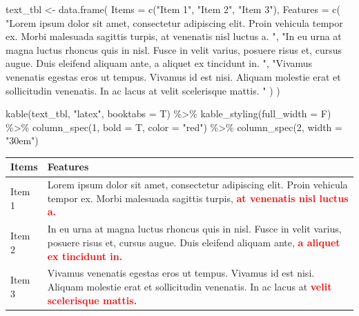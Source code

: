 \documentclass[12pt,a4paper,oneside,]{book}
\newenvironment{Shaded}{\begin{snugshade}}{\end{snugshade}}
\newcommand{\AttributeTok}[1]{\textcolor[rgb]{0.77,0.63,0.00}{#1}}
\newcommand{\DecValTok}[1]{\textcolor[rgb]{0.00,0.00,0.81}{#1}}
\newcommand{\FunctionTok}[1]{\textcolor[rgb]{0.00,0.00,0.00}{#1}}
\newcommand{\NormalTok}[1]{#1}
\newcommand{\OtherTok}[1]{\textcolor[rgb]{0.56,0.35,0.01}{#1}}
\newcommand{\SpecialCharTok}[1]{\textcolor[rgb]{0.00,0.00,0.00}{#1}}
\newcommand{\StringTok}[1]{\textcolor[rgb]{0.31,0.60,0.02}{#1}}
\numberwithin{dummy}{section}
\theoremstyle{ocrenumbox}
\theoremstyle{blacknumex}
\theoremstyle{blacknumbox}
\theoremstyle{ocrenum}
\theoremstyle{ocrenum}
\begin{document}
\begin{Shaded}
\begin{Highlighting}[]
\NormalTok{text\_tbl }\OtherTok{\textless{}{-}} \FunctionTok{data.frame}\NormalTok{(}
  \AttributeTok{Items =} \FunctionTok{c}\NormalTok{(}\StringTok{"Item 1"}\NormalTok{, }\StringTok{"Item 2"}\NormalTok{, }\StringTok{"Item 3"}\NormalTok{), }
  \AttributeTok{Features =} \FunctionTok{c}\NormalTok{(}
    \StringTok{"Lorem ipsum dolor sit amet, consectetur adipiscing elit.}
\StringTok{    Proin vehicula tempor ex. Morbi malesuada sagittis turpis,}
\StringTok{    at venenatis nisl luctus a. "}\NormalTok{,}
    \StringTok{"In eu urna at magna luctus rhoncus quis in nisl. Fusce in velit}
\StringTok{    varius, posuere risus et, cursus augue. Duis eleifend aliquam ante,}
\StringTok{    a aliquet ex tincidunt in. "}\NormalTok{,}
    \StringTok{"Vivamus venenatis egestas eros ut tempus. Vivamus id est nisi.}
\StringTok{    Aliquam molestie erat et sollicitudin venenatis. In ac lacus at}
\StringTok{    velit scelerisque mattis. "}
\NormalTok{    ) }
\NormalTok{  )}

\FunctionTok{kable}\NormalTok{(text\_tbl, }\StringTok{"latex"}\NormalTok{, }\AttributeTok{booktabs =}\NormalTok{ T) }\SpecialCharTok{\%\textgreater{}\%} 
  \FunctionTok{kable\_styling}\NormalTok{(}\AttributeTok{full\_width =}\NormalTok{ F) }\SpecialCharTok{\%\textgreater{}\%} 
  \FunctionTok{column\_spec}\NormalTok{(}\DecValTok{1}\NormalTok{, }\AttributeTok{bold =}\NormalTok{ T, }\AttributeTok{color =} \StringTok{"red"}\NormalTok{) }\SpecialCharTok{\%\textgreater{}\%} 
  \FunctionTok{column\_spec}\NormalTok{(}\DecValTok{2}\NormalTok{, }\AttributeTok{width =} \StringTok{"30em"}\NormalTok{)}
\end{Highlighting}
\end{Shaded}

\begin{table}
\centering
\begin{tabular}{>{}l>{\raggedright\arraybackslash}p{30em}}
\toprule
Items & Features\\
\midrule
Item 1 & Lorem ipsum dolor sit amet, consectetur adipiscing elit.
    Proin vehicula tempor ex. Morbi malesuada sagittis turpis,
\textcolor{red}{\textbf{    at venenatis nisl luctus a.}}\\
Item 2 & In eu urna at magna luctus rhoncus quis in nisl. Fusce in velit
    varius, posuere risus et, cursus augue. Duis eleifend aliquam ante,
\textcolor{red}{\textbf{    a aliquet ex tincidunt in.}}\\
Item 3 & Vivamus venenatis egestas eros ut tempus. Vivamus id est nisi.
    Aliquam molestie erat et sollicitudin venenatis. In ac lacus at
\textcolor{red}{\textbf{    velit scelerisque mattis.}}\\
\bottomrule
\end{tabular}
\end{table}
\end{document}
